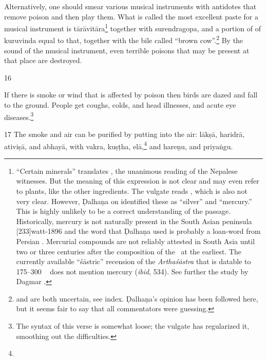 \begin{translation}
Alternatively, one should smear  various musical instruments with
antidotes that remove poison and then play  them. What is called the
most  excellent paste for a musical instrument is
\gls{tārāvitāra}\footnote{“Certain  minerals” translates
    , the unanimous  reading of the Nepalese  witnesses.
    But the meaning of this expression is not  clear and may even refer to
    plants, like the other ingredients.  The vulgate  reads ,  which is also not very clear.  However, Ḍalhaṇa on
     identified  these as “silver” and “mercury.” This is
    highly unlikely  to be a correct understanding of  the passage.
    Historically, mercury is not  naturally present in the South  Asian
    peninsula [233]{watt-1896}  and the word  that
    Ḍalhaṇa used is probably a loan-word from  Persian \citep[sub
    \emph{paranda, parranda}][244b]{stei-pers}. Mercurial compounds are
    not  reliably attested in South Asia until two or three  centuries
    after the composition  of the \SS\ at the earliest.  The currently
    available  “śāstric” recension of the  \emph{Arthaśāstra} that is
    datable to 175--300 \CE\  \citep[29--31]{oliv-2013} does  not mention
    mercury (\emph{ibid}, 534). See further the study by  Dagmar \citet[17,
    \emph{et passim}]{wuja-2013b}.}  together with  \gls{surendragopa},
    and a  portion of of \gls{kuruvinda} equal to that,  together with the
    bile called  “brown cow”.\footnote{  and
         are both  uncertain, see index. Ḍalhaṇa's opinion has
        been followed here, but it  seems fair to say that all commentators
        were  guessing.} By the sound of  the musical instrument, even
        terrible poisons that may be present  at that place are destroyed.

\item [16]  

If there is smoke or wind that  is affected by poison then  birds are
dazed and fall to the ground.  People get  coughs, colds, and head 
illnesses, and acute eye diseases.\footnote{The syntax  of this verse
    is somewhat  loose; the vulgate has regularized it, smoothing  out
    the difficulties.}

\item
[17]  The smoke and air can be  purified by putting into the  air:  \gls{lākṣā}, 
\gls{haridrā}, \gls{ativiṣā}, and \gls{abhayā}, with \gls{vakra}, \gls{kuṣṭha}, 
\gls{elā},\footnote{} and \gls{hareṇu}, and \gls{priyaṅgu}.  
\end{translation}  


